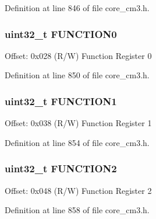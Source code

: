 Definition at line 846 of file core\+\_\+cm3.\+h.

\subsubsection[{\texorpdfstring{F\+U\+N\+C\+T\+I\+O\+N0}{FUNCTION0}}]{ uint32\+\_\+t F\+U\+N\+C\+T\+I\+O\+N0}\hypertarget{struct_d_w_t___type_ad3c69d206a52a85165eb7bd8077b0608}{}\label{struct_d_w_t___type_ad3c69d206a52a85165eb7bd8077b0608}
Offset\+: 0x028 (R/W) Function Register 0 

Definition at line 850 of file core\+\_\+cm3.\+h.

\subsubsection[{\texorpdfstring{F\+U\+N\+C\+T\+I\+O\+N1}{FUNCTION1}}]{ uint32\+\_\+t F\+U\+N\+C\+T\+I\+O\+N1}\hypertarget{struct_d_w_t___type_ae8f02e32e101c4cc61115d271fa12ffb}{}\label{struct_d_w_t___type_ae8f02e32e101c4cc61115d271fa12ffb}
Offset\+: 0x038 (R/W) Function Register 1 

Definition at line 854 of file core\+\_\+cm3.\+h.

\subsubsection[{\texorpdfstring{F\+U\+N\+C\+T\+I\+O\+N2}{FUNCTION2}}]{ uint32\+\_\+t F\+U\+N\+C\+T\+I\+O\+N2}\hypertarget{struct_d_w_t___type_a8ba3cc103077080ae3c0fc41e87d1197}{}\label{struct_d_w_t___type_a8ba3cc103077080ae3c0fc41e87d1197}
Offset\+: 0x048 (R/W) Function Register 2 

Definition at line 858 of file core\+\_\+cm3.\+h.


